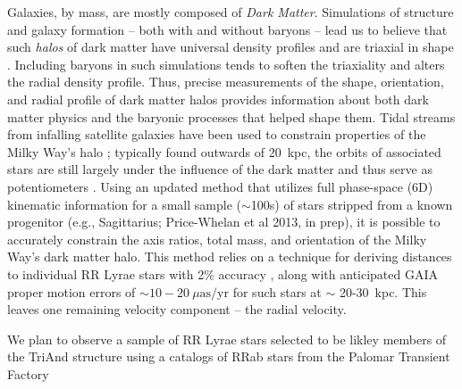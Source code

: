 \justification Galaxies, by mass, are mostly composed of \emph{Dark
  Matter}. Simulations of structure and galaxy formation -- both with
and without baryons -- lead us to believe that such \emph{halos} of
dark matter have universal density profiles \citep{nfw96} and are
triaxial in shape \citep{jing02}. Including baryons in such
simulations tends to soften the triaxiality and alters the radial
density profile. Thus, precise measurements of the shape, orientation,
and radial profile of dark matter halos provides information about
both dark matter physics and the baryonic processes that helped shape
them. Tidal streams from infalling satellite galaxies have been used
to constrain properties of the Milky Way's halo \citep[e.g.][]{law10};
typically found outwards of 20~kpc, the orbits of associated stars are
still largely under the influence of the dark matter and thus serve as
potentiometers \citep[e.g.][]{johnston99}. Using an updated method
that utilizes full phase-space (6D) kinematic information for a small
sample ($\sim$100s) of stars stripped from a known progenitor (e.g.,
Sagittarius; Price-Whelan et al 2013, in prep), it is possible to
accurately constrain the axis ratios, total mass, and orientation of
the Milky Way's dark matter halo. This method relies on a technique
for deriving distances to individual RR Lyrae stars with 2\% accuracy
\citep{madore12}, along with anticipated GAIA proper motion errors of
$\sim10-20~\mu\mathrm{as}/\mathrm{yr}$ for such stars at $\sim$
20-30~kpc. This leaves one remaining velocity component -- the radial
velocity.

We plan to observe a sample of RR Lyrae stars selected to be likley
members of the TriAnd structure using a catalogs of RRab stars from
the Palomar Transient Factory \citep[PTF][]{ptf}


\begin{references}


\end{references}



